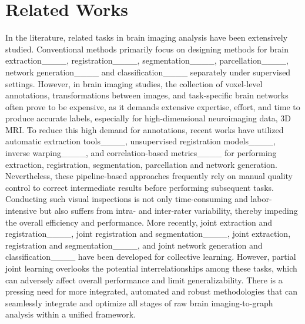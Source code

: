 \section{Related Works}
\label{sec:related}
In the literature, related tasks in brain imaging analysis have been extensively studied. Conventional methods primarily focus on designing methods for brain extraction____, registration____, segmentation____, parcellation____, network generation____ and classification____ separately under supervised settings. However, in brain imaging studies, the collection of voxel-level annotations, transformations between images, and task-specific brain networks often prove to be expensive, as it demands extensive expertise, effort, and time to produce accurate labels, especially for high-dimensional neuroimaging data, \eg 3D MRI. To reduce this high demand for annotations, recent works have utilized automatic extraction tools____, unsupervised registration models____, inverse warping____, and correlation-based metrics____ for performing extraction, registration, segmentation, parcellation and network generation. Nevertheless, these pipeline-based approaches frequently rely on manual quality control to correct intermediate results before performing subsequent tasks. Conducting such visual inspections is not only time-consuming and labor-intensive but also suffers from intra- and inter-rater variability, thereby impeding the overall efficiency and performance. More recently, joint extraction and registration____, joint registration and segmentation____, joint extraction, registration and segmentation____, and joint network generation and classification____ have been developed for collective learning. However, partial joint learning overlooks the potential interrelationships among these tasks, which can adversely affect overall performance and limit generalizability. There is a pressing need for more integrated, automated and robust methodologies that can seamlessly integrate and optimize all stages of raw brain imaging-to-graph analysis within a unified framework.